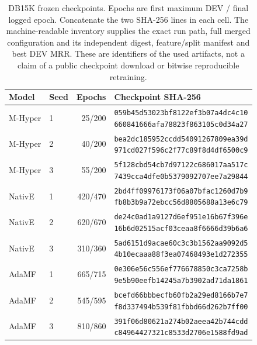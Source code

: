\begin{table}[htbp]
\centering\footnotesize
\caption{DB15K frozen checkpoints. Epochs are first maximum DEV / final logged epoch. Concatenate the two SHA-256 lines in each cell. The machine-readable inventory supplies the exact run path, full merged configuration and its independent digest, feature/split manifest and best DEV MRR. These are identifiers of the used artifacts, not a claim of a public checkpoint download or bitwise reproducible retraining.}
\label{tab:training-hashes-db15k}
\begin{tabular}{llrl}
\toprule
Model & Seed & Epochs & Checkpoint SHA-256\\
\midrule
M-Hyper & 1 & 25/200 & \shortstack[l]{\texttt{059b45d53023bf8122ef3b07a4dc4c10}\\\texttt{660841666afa78823f863105c0d34a27}}\\[3pt]
M-Hyper & 2 & 40/200 & \shortstack[l]{\texttt{bea2dc185952ccdd54091267809ea39d}\\\texttt{971cd027f596c2f77c89f8d4df6500c9}}\\[3pt]
M-Hyper & 3 & 55/200 & \shortstack[l]{\texttt{5f128cbd54cb7d97122c686017aa517c}\\\texttt{7439cca4dfe0b5379092707ee7a29844}}\\[3pt]
NativE & 1 & 420/470 & \shortstack[l]{\texttt{2bd4ff09976173f06a07bfac1260d7b9}\\\texttt{fb8b3b9a72ebcc56d8805688a13e6c79}}\\[3pt]
NativE & 2 & 620/670 & \shortstack[l]{\texttt{de24c0ad1a9127d6ef951e16b67f396e}\\\texttt{16b6d02515acf03ceaa8f6666d39b6a6}}\\[3pt]
NativE & 3 & 310/360 & \shortstack[l]{\texttt{5ad6151d9acae60c3c3b1562aa9092d5}\\\texttt{4b10ecaaa88f3ea07468493e1d272355}}\\[3pt]
AdaMF & 1 & 665/715 & \shortstack[l]{\texttt{0e306e56c556ef776678850c3ca7258b}\\\texttt{9e5b90eefb14245a7b3902ad71da1861}}\\[3pt]
AdaMF & 2 & 545/595 & \shortstack[l]{\texttt{bcefd66bbbecfb60fb2a29ed8166b7e7}\\\texttt{f8d337494b539f81fbbd66d262b7ff00}}\\[3pt]
AdaMF & 3 & 810/860 & \shortstack[l]{\texttt{391f06d80621a274b02aeea42b744cdd}\\\texttt{c84964427321c8533d2706e1588fd9ad}}\\[3pt]
\bottomrule
\end{tabular}
\end{table}

